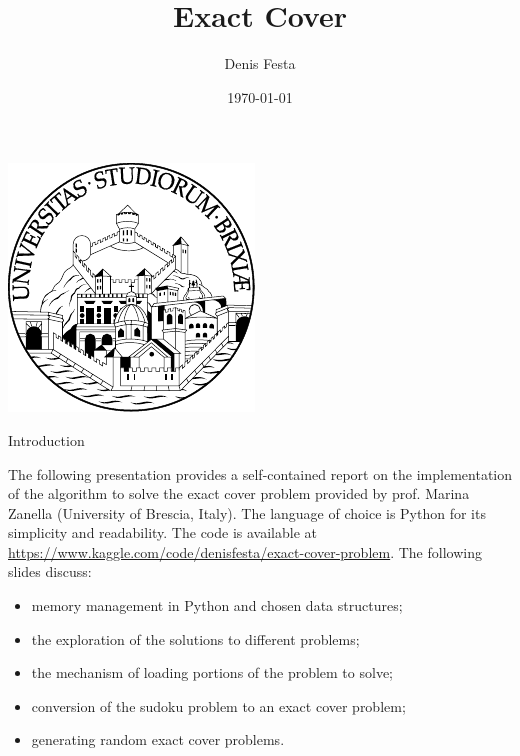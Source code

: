\documentclass{beamer}
\title{Exact Cover}
\author{Denis Festa}
\date{\today}
\begin{document}
\begin{frame}
    \titlepage
    \centering
    \includegraphics[width=0.2\linewidth]{unibs-circ-logo.pdf}
\end{frame}




\begin{frame}{Introduction}

    The following presentation provides a self-contained report on the 
    implementation of the algorithm to solve the exact cover problem provided by prof. Marina Zanella
    (University of Brescia, Italy).
    The language of choice is Python for its simplicity and readability.
    The code is available at \url{https://www.kaggle.com/code/denisfesta/exact-cover-problem}.
    The following slides discuss:
    \begin{itemize}
        \item memory management in Python and chosen data structures;
        \item the exploration of the solutions to different problems;
        \item the mechanism of loading portions of the problem to solve;
        \item conversion of the sudoku problem to an exact cover problem;
        \item generating random exact cover problems.
    \end{itemize}

\end{frame}
\end{document}
